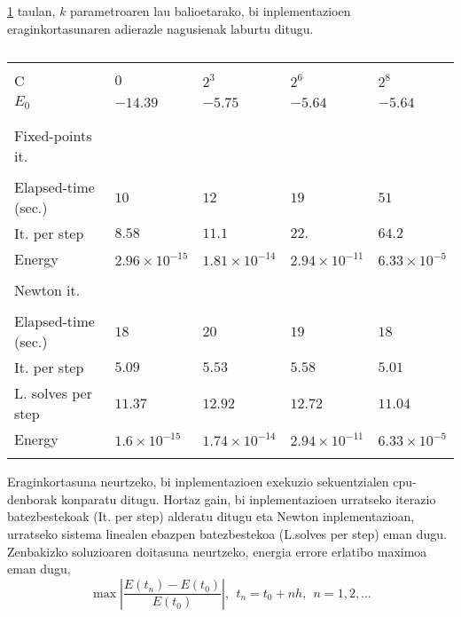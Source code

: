 \ref{tab:fp1} taulan, $k$ parametroaren lau balioetarako, bi inplementazioen eraginkortasunaren adierazle nagusienak laburtu ditugu.

\begin{table}[h!]
\caption[Fixed-point percentage of steps and mean iterations.] 
{}
\label{tab:fp1}       %
\centering
{%
\begin{tabular}{ l l l l l } 
 \hline
\\
 C               & $0$  & $2^3$ & $2^6$ & $2^8$ \\
 $E_0$           & $-14.39$  & $-5.75$ & $-5.64$ & $-5.64$ \\ 
\\
 \hline
\\
 Fixed-points it.&           &         &         &         \\
 \cline{1-1}     &           &         &         &         \\
 Elapsed-time (sec.)    & $10$      & $12$    & $19$    & $51$    \\ 
 It. per step    & $8.58$    & $11.1$  & $22.$  & $64.2$  \\
 Energy          & $2.96\times 10^{-15}$ & $1.81\times 10^{-14}$ & $2.94\times 10^{-11}$ & $6.33\times 10^{-5}$ \\
 \\
 Newton it.            &           &         &         &         \\
 \cline{1-1}           &           &         &         &         \\
 Elapsed-time (sec.)   & $18$      & $20$    & $19$    & $18$     \\
 It. per step          & $5.09$    & $5.53$  & $5.58$  & $5.01$   \\
 L. solves per step    & $11.37$   & $12.92$  & $12.72$  & $11.04$ \\
 Energy                & $1.6\times 10^{-15}$ & $1.74\times 10^{-14}$ & $2.94\times 10^{-11}$ & $6.33\times 10^{-5}$ \\   
 \\  
   \hline
 \end{tabular}}
\end{table}

Eraginkortasuna neurtzeko, bi inplementazioen exekuzio sekuentzialen cpu-denborak  konparatu ditugu. Hortaz gain, bi inplementazioen urratseko iterazio batezbestekoak (It. per step) alderatu ditugu eta Newton inplementazioan, urratseko sistema linealen ebazpen batezbestekoa (L.solves per step) eman dugu. Zenbakizko soluzioaren doitasuna neurtzeko, energia errore erlatibo maximoa eman dugu,
\begin{equation*}
\max | \frac{E(t_n)-E(t_0)}{E(t_0)} |, \ \  t_n=t_0+nh, \ \ n=1,2,\dots
\end{equation*} 

